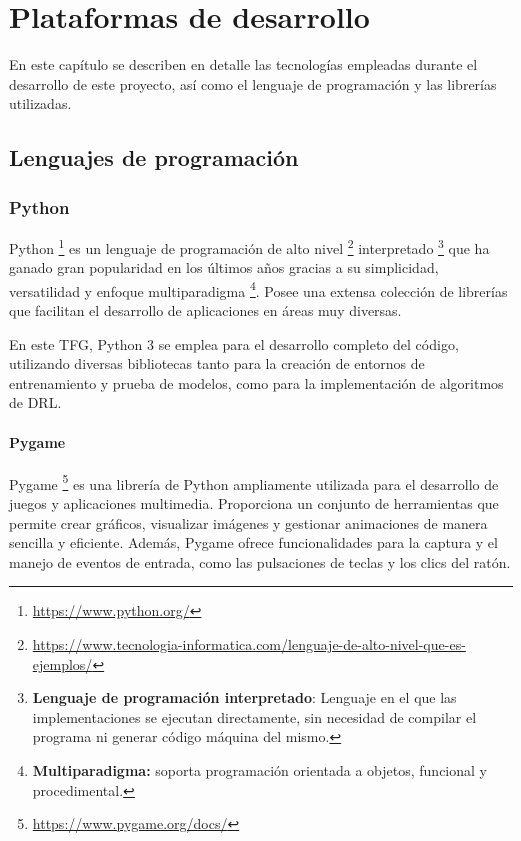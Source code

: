 \chapter{Plataformas de desarrollo}
\label{cap:capitulo3}

En este capítulo se describen en detalle las tecnologías empleadas durante el desarrollo de este proyecto, así como el lenguaje de programación y las librerías utilizadas.

\section{Lenguajes de programación}
\label{sec:programación}
\subsection{Python}
\label{sec:python}

Python \footnote{\url{https://www.python.org/}} es un lenguaje de programación de alto nivel \footnote{\url{https://www.tecnologia-informatica.com/lenguaje-de-alto-nivel-que-es-ejemplos/}} interpretado \footnote{\textbf{Lenguaje de programación interpretado}: Lenguaje en el que las implementaciones se ejecutan directamente, sin necesidad de compilar el programa ni generar código máquina del mismo.} que ha ganado gran popularidad en los últimos años gracias a su simplicidad, versatilidad y enfoque multiparadigma \footnote{\textbf{Multiparadigma:} soporta programación orientada a objetos, funcional y procedimental.}. Posee una extensa colección de librerías que facilitan el desarrollo de aplicaciones en áreas muy diversas.

En este \ac{TFG}, Python 3 se emplea para el desarrollo completo del código, utilizando diversas bibliotecas tanto para la creación de entornos de entrenamiento y prueba de modelos, como para la implementación de algoritmos de {DRL}.

\subsubsection{Pygame}
\label{sec:pygame}

Pygame \footnote{\url{https://www.pygame.org/docs/}} es una librería de Python ampliamente utilizada para el desarrollo de juegos y aplicaciones multimedia. Proporciona un conjunto de herramientas que permite crear gráficos, visualizar imágenes y gestionar animaciones de manera sencilla y eficiente. Además, Pygame ofrece funcionalidades para la captura y el manejo de eventos de entrada, como las pulsaciones de teclas y los clics del ratón.


